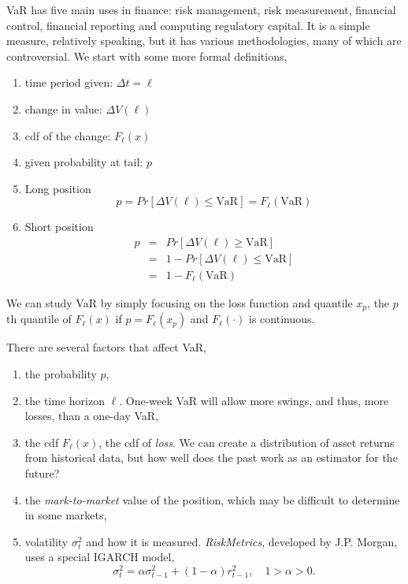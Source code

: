 VaR has five main uses in finance: risk management, risk measurement, financial control, financial reporting and computing regulatory capital. It is a simple measure, relatively speaking, but it has various methodologies, many of which are controversial. We start with some more formal definitions,
\begin{enumerate}
\item time period given: $\Delta t = \ell$
\item change in value: $\Delta V(\ell)$
\item cdf of the change: $F_{\ell}(x)$
\item given probability at tail: $p$
\item Long position
\[
p=Pr[\Delta V(\ell) \le \text{VaR}]=F_{\ell}(\text{VaR})
\]
\item Short position \\
\begin{eqnarray*}
p &=& Pr[\Delta V(\ell) \ge \text{VaR}] \\
&=& 1 - Pr[\Delta V(\ell) \le \text{VaR}] \\
&=& 1 - F_{\ell}(\text{VaR})
\end{eqnarray*}
\end{enumerate}
We can study VaR by simply focusing on the loss function and quantile $x_p$, the $p$th quantile of $F_{\ell}(x)$ if
$p=F_{\ell}(x_p)$ and $F_{\ell}(\cdot)$ is continuous.

There are several factors that affect VaR,
\begin{enumerate}
\item the probability $p$,
\item the time horizon $\ell$. One-week VaR will allow more swings, and thus, more losses, than a one-day VaR,
\item the cdf $F_{\ell}(x)$, the cdf of \emph{loss}. We can create a distribution of asset returns from historical data, but how well does the past work as an estimator for the future?
\item the \emph{mark-to-market} value of the position, which may be difficult to determine in some markets,
\item volatility $\sigma^2_t$ and how it is measured. \emph{RiskMetrics}, developed by J.P. Morgan, uses a special IGARCH model,
\[
\sigma^2_t = \alpha \sigma^2_{t-1}+(1-\alpha)r^2_{t-1}, \quad 1 > \alpha > 0.
\]
\end{enumerate}

